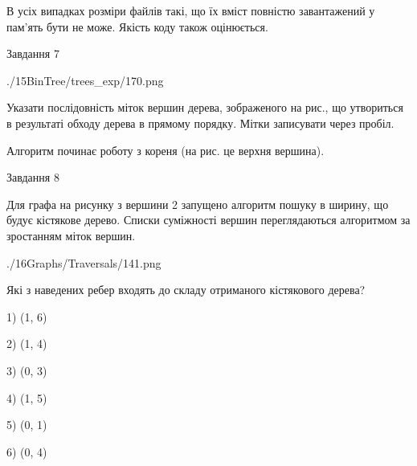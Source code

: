 \documentclass[12pt, ukrainian]{article}
\begin{document}
{В усіх випадках розміри файлів такі, що їх вміст повністю завантажений у пам'ять бути не може. Якість коду також оцінюється.



\vspace{10mm}\par

\newpage
\begin{minipage}[t]{9.7cm}
               
{\begin{center}Завдання {7}\end{center}}
\vspace{-6mm}

\begin{center}
	{./15BinTree/trees_exp/170.png}
\end{center}
Указати послідовність міток вершин дерева, зображеного на рис., що утвориться в результаті обходу дерева в прямому порядку. Мітки записувати через пробіл.\par Алгоритм починає роботу з кореня (на рис. це верхня вершина).\par

\end{minipage}
\vline \hspace{8mm}
\begin{minipage}[t]{8.0cm}
               
{\begin{center}Завдання {8}\end{center}}
\vspace{-6mm}
Для графа на рисунку з вершини 2 запущено алгоритм пошуку в ширину, що будує кістякове дерево. Списки суміжності вершин переглядаються алгоритмом за зростанням міток вершин.\par
\begin{center}
	{./16Graphs/Traversals/141.png}
\end{center}
\par Які з наведених ребер входять до складу отриманого кістякового дерева?\par
1) (1, 6)\par
2) (1, 4)\par
3) (0, 3)\par
4) (1, 5)\par
5) (0, 1)\par
6) (0, 4)\par
{\vskip 15pt} \par


\end{minipage}}
\end{document}
